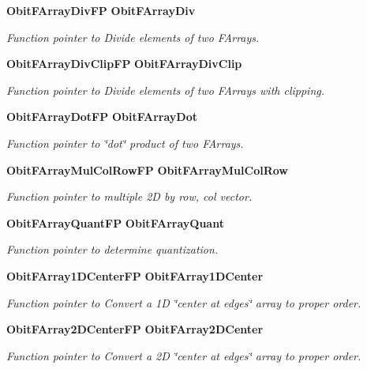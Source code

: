 \begin{CompactItemize}
{\bf Obit\-FArray\-Div\-FP} {\bf Obit\-FArray\-Div}
\begin{CompactList}\small\item\em Function pointer to Divide elements of two FArrays. \item\end{CompactList}\item 
{\bf Obit\-FArray\-Div\-Clip\-FP} {\bf Obit\-FArray\-Div\-Clip}
\begin{CompactList}\small\item\em Function pointer to Divide elements of two FArrays with clipping. \item\end{CompactList}\item 
{\bf Obit\-FArray\-Dot\-FP} {\bf Obit\-FArray\-Dot}
\begin{CompactList}\small\item\em Function pointer to \char`\"{}dot\char`\"{} product of two FArrays. \item\end{CompactList}\item 
{\bf Obit\-FArray\-Mul\-Col\-Row\-FP} {\bf Obit\-FArray\-Mul\-Col\-Row}
\begin{CompactList}\small\item\em Function pointer to multiple 2D by row, col vector. \item\end{CompactList}\item 
{\bf Obit\-FArray\-Quant\-FP} {\bf Obit\-FArray\-Quant}
\begin{CompactList}\small\item\em Function pointer to determine quantization. \item\end{CompactList}\item 
{\bf Obit\-FArray1DCenter\-FP} {\bf Obit\-FArray1DCenter}
\begin{CompactList}\small\item\em Function pointer to Convert a 1D \char`\"{}center at edges\char`\"{} array to proper order. \item\end{CompactList}\item 
{\bf Obit\-FArray2DCenter\-FP} {\bf Obit\-FArray2DCenter}
\begin{CompactList}\small\item\em Function pointer to Convert a 2D \char`\"{}center at edges\char`\"{} array to proper order. \item\end{CompactList}\item 

\end{CompactItemize}
